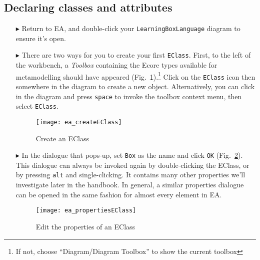 \newpage
\subsection{Declaring classes and attributes}
\visHeader
\hypertarget{static:classes vis}{}

\begin{itemize}

\item[$\blacktriangleright$] Return to EA, and double-click your \texttt{LearningBoxLanguage} diagram to ensure it's open.

\vspace{0.5cm}

\item[$\blacktriangleright$] There are two ways for you to create your first \texttt{EClass}. First, to the left of the workbench, a \emph{Toolbox} containing
the Ecore types available for metamodelling should have appeared (Fig.~\ref{ea:eclass}).\footnote{If not, choose ``Diagram/Diagram Toolbox'' to show the
current toolbox} Click on the \texttt{EClass} icon then somewhere in the diagram to create a new object. Alternatively, you can click in the diagram and press
\texttt{space} to invoke the toolbox context menu, then select \texttt{EClass}.

\vspace{0.5cm}

\begin{figure}[htbp]
	\centering
  \texttt{[image: ea\_createEClass]}
	\caption{Create an EClass}
	\label{ea:eclass}
\end{figure}

\vspace{0.5cm}

\item[$\blacktriangleright$] In the dialogue that pops-up, set \texttt{Box} as the name and click \texttt{OK} (Fig.~\ref{ea:eclass_properties}).
This dialogue can always be invoked again by double-clicking the EClass, or by pressing \texttt{alt} and single-clicking. It contains many other properties
we'll investigate later in the handbook. In general, a similar properties dialogue can be opened in the same fashion for almost every element in EA.

\clearpage

\begin{figure}[ht]
	\centering
  \texttt{[image: ea\_propertiesEClass]}
	\caption{Edit the properties of an EClass}
	\label{ea:eclass_properties}
\end{figure}


\end{itemize}
